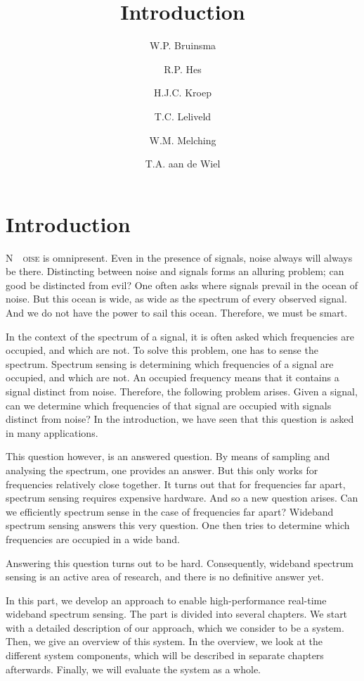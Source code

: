 \documentclass[a4paper, openany, oneside]{memoir}
\title{Introduction}
\author{W.P. Bruinsma \and R.P. Hes \and H.J.C. Kroep \and T.C. Leliveld \and W.M. Melching \and T.A. aan de Wiel}
\begin{document}
\chapter{Introduction}
\lettrine[lines=3]{N}{~~oise} is omnipresent. Even in the presence of signals, noise always will always be there. Distincting between noise and signals forms an alluring problem; can good be distincted from evil? One often asks where signals prevail in the ocean of noise. But this ocean is wide, as wide as the spectrum of every observed signal. And we do not have the power to sail this ocean. Therefore, we must be smart.

In the context of the spectrum of a signal, it is often asked which frequencies are occupied, and which are not. To solve this problem, one has to sense the spectrum. Spectrum sensing is determining which frequencies of a signal are occupied, and which are not. An occupied frequency means that it contains a signal distinct from noise. Therefore, the following problem arises. Given a signal, can we determine which frequencies of that signal are occupied with signals distinct from noise? In the introduction, we have seen that this question is asked in many applications.

This question however, is an answered question. By means of sampling and analysing the spectrum, one provides an answer. But this only works for frequencies relatively close together. It turns out that for frequencies far apart, spectrum sensing requires expensive hardware. And so a new question arises. Can we efficiently spectrum sense in the case of frequencies far apart? Wideband spectrum sensing answers this very question. One then tries to determine which frequencies are occupied in a wide band.

Answering this question turns out to be hard. Consequently, wideband spectrum sensing is an active area of research, and there is no definitive answer yet.

In this part, we develop an approach to enable high-performance real-time wideband spectrum sensing. The part is divided into several chapters. We start with a detailed description of our approach, which we consider to be a system. Then, we give an overview of this system. In the overview, we look at the different system components, which will be described in separate chapters afterwards. Finally, we will evaluate the system as a whole.
\end{document}
